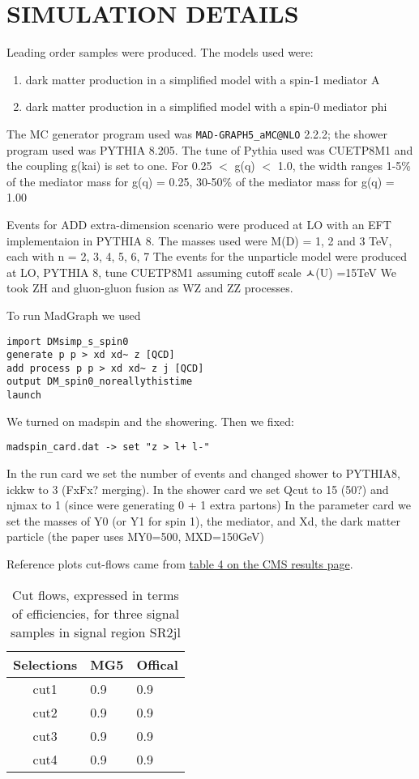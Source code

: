 \documentclass[12pt,A4paper]{article}
\begin{document}
\section{SIMULATION DETAILS}
Leading order samples were produced.
The models used were:
\begin{enumerate}
\item
dark matter production in a simplified model with a spin-1 mediator A
\item
dark matter production in a simplified model with a spin-0 mediator phi
\end{enumerate}
The MC generator program used was \texttt{MAD-GRAPH5\_aMC@NLO} 2.2.2; the shower program used was PYTHIA 8.205.
The tune of Pythia used was CUETP8M1 and the coupling g(kai) is set to one.
For 0.25 $<$ g(q) $<$ 1.0,
the width ranges 1-5\% of the mediator mass for g(q) = 0.25,
    30-50\% of the mediator mass for g(q) = 1.00

Events for ADD extra-dimension scenario were produced at LO with an EFT implementaion in PYTHIA 8.
The masses used were M(D) = 1, 2 and 3 TeV, each with n = 2, 3, 4, 5, 6, 7
The events for the unparticle model were produced at LO, PYTHIA 8, tune CUETP8M1 assuming cutoff scale ㅅ(U) =15TeV
We took ZH and gluon-gluon fusion as WZ and ZZ processes.

To run MadGraph we used
\begin{lstlisting}
import DMsimp_s_spin0
generate p p > xd xd~ z [QCD]
add process p p > xd xd~ z j [QCD]
output DM_spin0_noreallythistime
launch
\end{lstlisting}

We turned on madspin and the showering. Then we fixed:
\begin{lstlisting}
madspin_card.dat -> set "z > l+ l-"
\end{lstlisting}

In the run card we set the number of events and changed shower to PYTHIA8, ickkw to 3 (FxFx? merging).
In the shower card we set Qcut to 15 (50?) and njmax to 1 (since were generating 0 + 1 extra partons)
In the parameter card we set the masses of Y0 (or Y1 for spin 1), the mediator, and Xd, the dark matter particle (the paper uses MY0=500, MXD=150GeV)

Reference plots cut-flows came from \href{http://cms-results.web.cern.ch/cms-results/public-results/preliminary-results/EXO-16-052/CMS-PAS-EXO-16-052_Table_004.png}{table 4 on the CMS results page}.



\begin{table}[htb]
\centering
\vspace{5pt}
\begin{tabular}{|c||l|l|}
\hline
Selections & MG5 & Offical \\
\hline
cut1 & 0.9 & 0.9 \\
\hline
cut2 & 0.9 & 0.9 \\
\hline
cut3 & 0.9 & 0.9 \\
\hline
cut4 & 0.9 & 0.9 \\
\hline
\end{tabular}
\caption{Cut flows, expressed in terms of efficiencies, for three signal samples in signal region SR2jl}\label{tab:cutflow}

\end{table}
\end{document}

